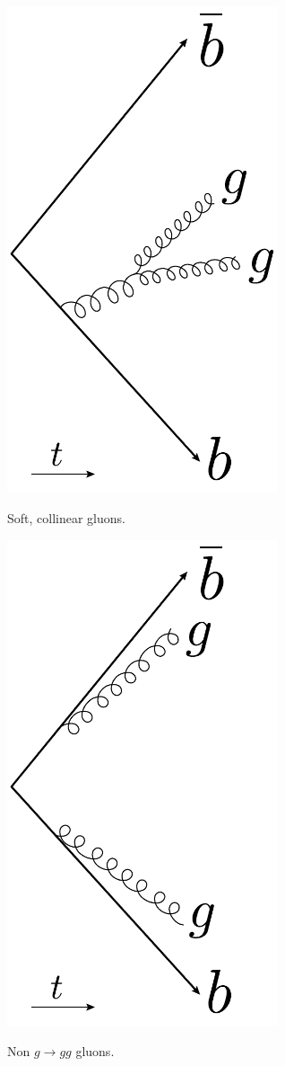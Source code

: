 \begin{marginfigure}[-1cm]
  \centerfloat
  \includegraphics[width=0.6\textwidth]{figures/R_kt_CA/soft_collinear.pdf}
  \caption[Soft Collinear Gluons in 4-Jet Events]
          {Soft, collinear gluons.} 
  \label{fig:q:kt_CA_soft_collinear}
\end{marginfigure}

\begin{marginfigure}[0.5cm]
  \centerfloat
  \includegraphics[width=0.6\textwidth]{figures/R_kt_CA/hard_non_g_to_gg.pdf}
  \caption[Non $g\rightarrow gg$ Gluons in 4-Jet Events]
          {Non $g\rightarrow gg$ gluons.} 
  \label{fig:q:kt_CA_hard_non_g_to_gg}
\end{marginfigure}

